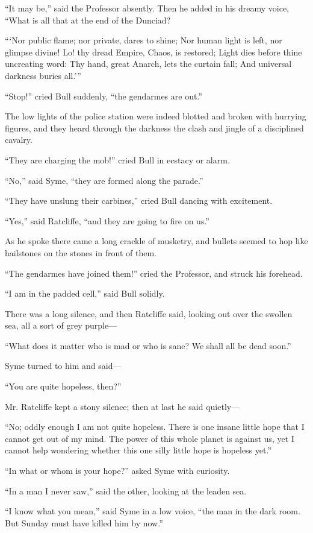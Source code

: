 “It may be,” said the Professor absently. Then he added in his dreamy voice, “What is all that at the end of the Dunciad?

    “ ‘Nor public flame; nor private, dares to shine; Nor human light is left, nor glimpse divine! Lo! thy dread Empire, Chaos, is restored; Light dies before thine uncreating word: Thy hand, great Anarch, lets the curtain fall; And universal darkness buries all.’ ”

“Stop!” cried Bull suddenly, “the gendarmes are out.”

The low lights of the police station were indeed blotted and broken with hurrying figures, and they heard through the darkness the clash and jingle of a disciplined cavalry.

“They are charging the mob!” cried Bull in ecstacy or alarm.

“No,” said Syme, “they are formed along the parade.”

“They have unslung their carbines,” cried Bull dancing with excitement.

“Yes,” said Ratcliffe, “and they are going to fire on us.”

As he spoke there came a long crackle of musketry, and bullets seemed to hop like hailstones on the stones in front of them.

“The gendarmes have joined them!” cried the Professor, and struck his forehead.

“I am in the padded cell,” said Bull solidly.

There was a long silence, and then Ratcliffe said, looking out over the swollen sea, all a sort of grey purple⁠—

“What does it matter who is mad or who is sane? We shall all be dead soon.”

Syme turned to him and said⁠—

“You are quite hopeless, then?”

Mr. Ratcliffe kept a stony silence; then at last he said quietly⁠—

“No; oddly enough I am not quite hopeless. There is one insane little hope that I cannot get out of my mind. The power of this whole planet is against us, yet I cannot help wondering whether this one silly little hope is hopeless yet.”

“In what or whom is your hope?” asked Syme with curiosity.

“In a man I never saw,” said the other, looking at the leaden sea.

“I know what you mean,” said Syme in a low voice, “the man in the dark room. But Sunday must have killed him by now.”

